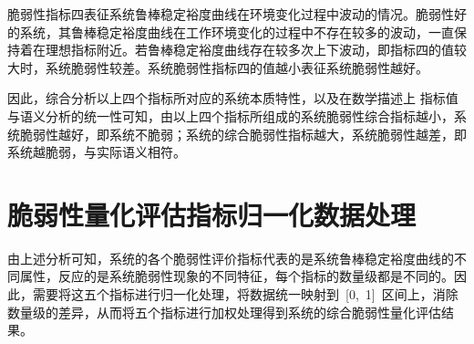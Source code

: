 脆弱性指标四表征系统鲁棒稳定裕度曲线在环境变化过程中波动的情况。脆弱性好的系统，其鲁棒稳定裕度曲线在工作环境变化的过程中不存在较多的波动，一直保持着在理想指标附近。若鲁棒稳定裕度曲线存在较多次上下波动，即指标四的值较大时，系统脆弱性较差。系统脆弱性指标四的值越小表征系统脆弱性越好。

因此，综合分析以上四个指标所对应的系统本质特性，以及在数学描述上
指标值与语义分析的统一性可知，由以上四个指标所组成的系统脆弱性综合指标越小，系统脆弱性越好，即系统不脆弱；系统的综合脆弱性指标越大，系统脆弱性越差，即系统越脆弱，与实际语义相符。
\section{脆弱性量化评估指标归一化数据处理}
\label{sec:chap4:Fragility_DataAnalysis}
由上述分析可知，系统的各个脆弱性评价指标代表的是系统鲁棒稳定裕度曲线的不同属性，反应的是系统脆弱性现象的不同特征，每个指标的数量级都是不同的。因此，需要将这五个指标进行归一化处理，将数据统一映射到~[0,~1]~区间上，消除数量级的差异，从而将五个指标进行加权处理得到系统的综合脆弱性量化评估结果。
